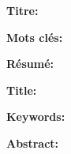 {{{\begin{mdframed}[linecolor=Prune,linewidth=1]
    
    \textbf{Titre:} \thesistitre\dotfill{}
    
    \noindent \textbf{Mots clés:} \thesismotscles\dotfill{}
    
    \vspace{-4mm}
    \begin{multicols}{2}
    \begin{otherlanguage}{french}
        \noindent \textbf{Résumé:} \thesisresume
    \end{otherlanguage}%
    \end{multicols}%
    
\end{mdframed}

\vspace{1mm}

\begin{mdframed}[linecolor=Prune,linewidth=1]
    
    \textbf{Title:} \thesistitle\dotfill{}
    
    \noindent \textbf{Keywords:} \thesiskeywords\dotfill{}
    
    \vspace{-4mm}
    \begin{multicols}{2}
        \noindent \textbf{Abstract:} \thesisabstract
    \end{multicols}
\end{mdframed}

} %

} %
} %




